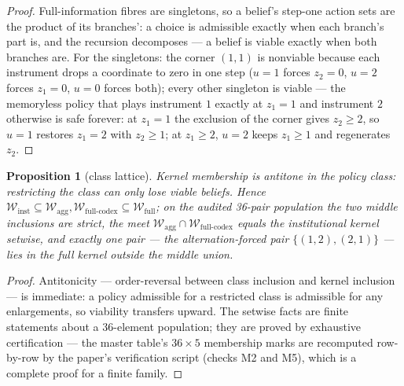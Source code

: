 \documentclass[10pt,twocolumn]{article}
\theoremstyle{plain}
\newtheorem{proposition}[theorem]{Proposition}
\theoremstyle{definition}
\theoremstyle{remark}
\begin{document}
\begin{proof}
Full-information fibres are singletons, so a belief's step-one action
sets are the product of its branches': a choice is admissible exactly
when each branch's part is, and the recursion decomposes --- a belief is
viable exactly when both branches are. For the singletons: the corner
\((1,1)\) is nonviable because each instrument drops a coordinate to
zero in one step (\(u = 1\) forces \(z_2 = 0\), \(u = 2\) forces
\(z_1 = 0\), \(u = 0\) forces both); every other singleton is viable
--- the memoryless policy that plays instrument \(1\) exactly at
\(z_1 = 1\) and instrument \(2\) otherwise is safe forever: at
\(z_1 = 1\) the exclusion of the corner gives \(z_2 \ge 2\), so
\(u = 1\) restores \(z_1 = 2\) with \(z_2 \ge 1\); at
\(z_1 \ge 2\), \(u = 2\) keeps \(z_1 \ge 1\) and regenerates
\(z_2\).
\end{proof}

\begin{proposition}[class lattice]\label{audit-prop:lattice}
Kernel membership is antitone in the policy class: restricting the class
can only lose viable beliefs. Hence
\(\mathcal{W}_{\mathrm{inst}} \subseteq \mathcal{W}_{\mathrm{agg}},
\mathcal{W}_{\mathrm{full\text{-}codex}} \subseteq
\mathcal{W}_{\mathrm{full}}\); on the audited 36-pair population the
two middle inclusions are strict, the meet
\(\mathcal{W}_{\mathrm{agg}} \cap
\mathcal{W}_{\mathrm{full\text{-}codex}}\) equals the institutional
kernel setwise, and exactly one pair --- the alternation-forced pair
\(\{(1,2),(2,1)\}\) --- lies in the full kernel outside the middle
union.
\end{proposition}

\begin{proof}
Antitonicity --- order-reversal between class inclusion and kernel inclusion --- is immediate: a policy admissible for a restricted class is
admissible for any enlargements, so viability transfers upward. The
setwise facts are finite statements about a 36-element population; they
are proved by exhaustive certification --- the master table's
\(36 \times 5\) membership marks are recomputed row-by-row by the paper's verification script (checks M2 and M5), which is a complete
proof for a finite family.
\end{proof}
\end{document}
